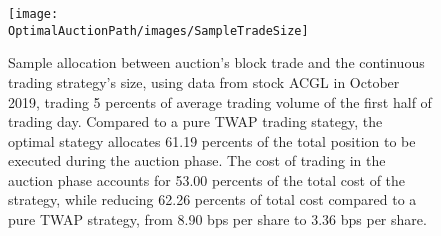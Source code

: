 
\begin{figure}[h]
  \texttt{[image: \\OptimalAuctionPath/images/SampleTradeSize]}
  \caption{Sample allocation between auction's block trade and the continuous trading strategy's size, using data from stock ACGL in October 2019, trading 5 percents of average trading volume of the first half of trading day. Compared to a pure TWAP trading stategy, the optimal stategy allocates 61.19 percents of the total position to be executed during the auction phase. The cost of trading in the auction phase accounts for 53.00 percents of the total cost of the strategy, while reducing 62.26 percents of total cost compared to a pure TWAP strategy, from 8.90 bps per share to 3.36 bps per share.}
  \label{fig:optimal_sizes}
\end{figure}

